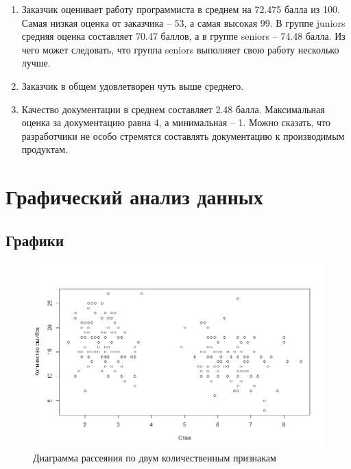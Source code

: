 \begin{enumerate}
	\item Заказчик оценивает работу программиста в среднем на 72.475 балла из 100. Самая низкая оценка от заказчика -- 53, а самая высокая 99. В группе juniors средняя оценка составляет 70.47 баллов, а в группе seniors -- 74.48 балла. Из чего может следовать, что группа seniors выполняет свою работу несколько лучше.
	
	\item Заказчик в общем удовлетворен чуть выше среднего.
	
	\item Качество документации в среднем составляет 2.48 балла. Максимальная оценка за документацию равна 4, а минимальная -- 1. Можно сказать, что разработчики не особо стремятся составлять документацию к производимым продуктам.
\end{enumerate}











\section{Графический анализ данных}

\subsection{Графики}

\begin{figure}[H]
	\centering
	\includegraphics[width=\linewidth]{fig3}
	\caption{Диаграмма рассеяния по двум количественным признакам}
\end{figure}

